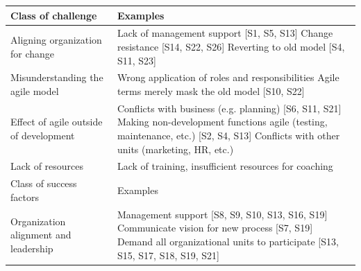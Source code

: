 \documentclass[lnbip]{svmultln}
\begin{document}
\begin{table}[t]
    \begin{tabular}{ p{} p{} }
        \toprule
        Class of challenge  & Examples   \\ \midrule
        
        \raggedright Aligning organization for change  &
             Lack of management support [S1, S5, S13]\newline
             Change resistance [S14, S22, S26] \newline
             Reverting to old model [S4, S11, S23] \\ 
        
        \raggedright\rule{0pt}{0.4cm}Misunderstanding the agile model  &
             Wrong application of roles and responsibilities \newline
             [S11, S13, S16, S17, S23, S24] \newline
             Agile terms merely mask the old model [S10, S22] \\
        
        \raggedright\rule{0pt}{0.4cm}Effect of agile outside of development  &
            Conflicts with business (e.g. planning) [S6, S11, S21] \newline
            Making non-development functions agile (testing, maintenance, etc.) [S2, S4, S13]\newline
            Conflicts with other units (marketing, HR, etc.) \newline[S6, S10, S11, S13] \\
        
        \raggedright\rule{0pt}{0.4cm}Lack of resources  &
            Lack of training, insufficient resources for coaching \newline
            [S5, S13, S22, S28]\\
        
        \midrule
        Class of success factors  & Examples   \\ \midrule
        
        \raggedright Organization alignment and leadership  &
             Management support [S8, S9, S10, S13, S16, S19] \newline
             Communicate vision for new process [S7, S19] \newline
             Demand all organizational units to participate [S13, S15, S17, S18, S19, S21] \\ 
        

\end{tabular}
\end{table}
\end{document}
